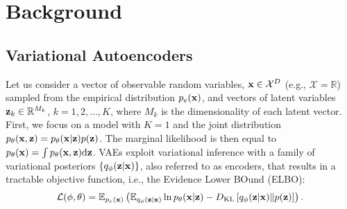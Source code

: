 

\section{Background}

\subsection{Variational Autoencoders}
Let us consider a vector of observable random variables, ${\mathbf{x}} \in \mathcal{X}^{D}$ (e.g., $\mathcal{X} = \mathbb{R}$) sampled from  the empirical distribution $p_{e}(\mathbf{{\mathbf{x}}})$, and vectors of latent variables ${\mathbf{z}}_{k} \in \mathbb{R}^{M_{k}}$, $k=1, 2, \ldots, K$, where $M_k$ is the dimensionality of each latent vector. First, we focus on a model with $K=1$ and the joint distribution $p_{\theta}({\mathbf{x}}, {\mathbf{z}}) = {p_{\theta}({\mathbf{x}}|{\mathbf{z}})} p({\mathbf{z}})$. The marginal likelihood is then equal to $p_{\theta}({\mathbf{x}}) = \int p_{\theta}({\mathbf{x}}, {\mathbf{z}}) \mathrm{d} {\mathbf{z}}$. VAEs exploit variational inference \cite{jordan1999introduction} with a family of variational posteriors $\{{q_{\phi}({\mathbf{z}}|{\mathbf{x}})}\}$, also referred to as encoders, that results in a tractable objective function, i.e., the Evidence Lower BOund (ELBO): 
 \begin{align}
     \mathcal{L}(\phi, \theta)
     = \mathbb{E}_{p_{e}(\mathbf{{\mathbf{x}}})}\left( \mathbb{E}_{{q_{\phi}({\mathbf{z}}|{\mathbf{x}})}}\ln {p_{\theta}({\mathbf{x}}|{\mathbf{z}})} - D_{\mathrm{KL}}\left[{q_{\phi}({\mathbf{z}}|{\mathbf{x}})}\|p({\mathbf{z}})\right] \right).
 \end{align}

